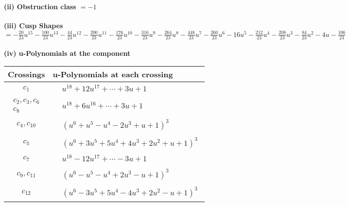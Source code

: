 \documentclass[1p]{elsarticle_modified}
\theoremstyle{definition}
\begin{document}
\flushleft \textbf{(ii) Obstruction class $= -1$}\\~\\
\flushleft \textbf{(iii) Cusp Shapes $= -\frac{20}{23} u^{15}-\frac{100}{23} u^{13}-\frac{44}{23} u^{12}-\frac{200}{23} u^{11}-\frac{176}{23} u^{10}-\frac{316}{23} u^9-\frac{264}{23} u^8-\frac{448}{23} u^7-\frac{260}{23} u^6-16 u^5-\frac{212}{23} u^4-\frac{208}{23} u^3-\frac{84}{23} u^2-4 u-\frac{106}{23}$}\\~\\
\newpage\renewcommand{\arraystretch}{1}
\flushleft \textbf{(iv) u-Polynomials at the component}\newline \\
\begin{tabular}{m{50pt}|m{274pt}}
Crossings & \hspace{64pt}u-Polynomials at each crossing \\
\hline $$\begin{aligned}c_{1}\end{aligned}$$&$\begin{aligned}
&u^{18}+12 u^{17}+\cdots+3 u+1
\end{aligned}$\\
\hline $$\begin{aligned}c_{2},c_{3},c_{6}\\c_{8}\end{aligned}$$&$\begin{aligned}
&u^{18}+6 u^{16}+\cdots+3 u+1
\end{aligned}$\\
\hline $$\begin{aligned}c_{4},c_{10}\end{aligned}$$&$\begin{aligned}
&(u^6+u^5- u^4-2 u^3+u+1)^3
\end{aligned}$\\
\hline $$\begin{aligned}c_{5}\end{aligned}$$&$\begin{aligned}
&(u^6+3 u^5+5 u^4+4 u^3+2 u^2+u+1)^3
\end{aligned}$\\
\hline $$\begin{aligned}c_{7}\end{aligned}$$&$\begin{aligned}
&u^{18}-12 u^{17}+\cdots-3 u+1
\end{aligned}$\\
\hline $$\begin{aligned}c_{9},c_{11}\end{aligned}$$&$\begin{aligned}
&(u^6- u^5- u^4+2 u^3- u+1)^3
\end{aligned}$\\
\hline $$\begin{aligned}c_{12}\end{aligned}$$&$\begin{aligned}
&(u^6-3 u^5+5 u^4-4 u^3+2 u^2- u+1)^3
\end{aligned}$\\
\hline
\end{tabular}\\~\\
\end{document}
